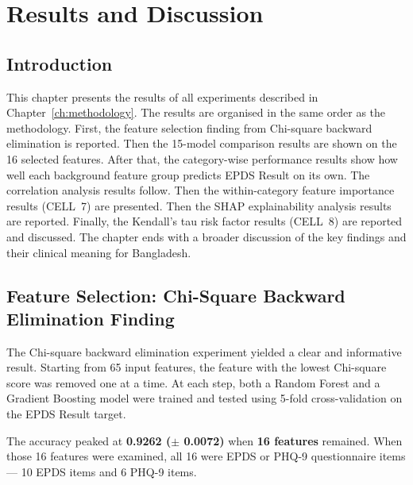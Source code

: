 
\chapter{Results and Discussion}
\label{ch:results}

\section{Introduction}
\label{ch4-sec-intro}

This chapter presents the results of all experiments described in Chapter~\ref{ch:methodology}.
The results are organised in the same order as the methodology.
First, the feature selection finding from Chi-square backward elimination is reported.
Then the 15-model comparison results are shown on the 16 selected features.
After that, the category-wise performance results show how well each background feature group predicts EPDS Result on its own.
The correlation analysis results follow.
Then the within-category feature importance results (CELL~7) are presented.
Then the SHAP explainability analysis results are reported.
Finally, the Kendall's tau risk factor results (CELL~8) are reported and discussed.
The chapter ends with a broader discussion of the key findings and their clinical meaning for Bangladesh.

\section{Feature Selection: Chi-Square Backward Elimination Finding}
\label{ch4-sec-featuresel}

The Chi-square backward elimination experiment yielded a clear and informative result.
Starting from 65 input features, the feature with the lowest Chi-square score was removed one at a time.
At each step, both a Random Forest and a Gradient Boosting model were trained and tested using 5-fold cross-validation on the EPDS Result target.

The accuracy peaked at \textbf{0.9262 ($\pm$ 0.0072)} when \textbf{16 features} remained.
When those 16 features were examined, all 16 were EPDS or PHQ-9 questionnaire items --- 10 EPDS items and 6 PHQ-9 items.

